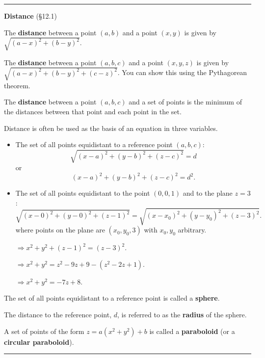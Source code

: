 \documentclass[12pt,letterpaper,noanswers]{exam}
\begin{document}
\vspace{0.2cm}
\hrule
\vspace{0.2cm}

\noindent\textbf{Distance} (\S12.1)
\begin{tcolorbox}
The \textbf{distance} between a point $(a,b)$ and a point $(x,y)$ is given by $\sqrt{(a-x)^2+(b-y)^2}$.

The \textbf{distance} between a point $(a,b,c)$ and a point $(x,y,z)$ is given by $\sqrt{(a-x)^2+(b-y)^2+(c-z)^2}$.  You can show this using the Pythagorean theorem.

The \textbf{distance} between a point $(a,b,c)$ and a set of points is the minimum of the distances between that point and each point in the set.
\end{tcolorbox}

Distance is often be used as the basis of an equation in three variables.

\begin{itemize}
    \item The set of all points equidistant to a reference point $(a,b,c)$: \[\sqrt{(x-a)^2+(y-b)^2 + (z-c)^2} = d\] or \[(x-a)^2 + (y-b)^2 + (z-c)^2 = d^2.\]
    \item The set of all points equidistant to the point $(0,0,1)$ and to the plane $z = 3$:
    \[\sqrt{(x-0)^2+(y-0)^2+(z-1)^2} = \sqrt{(x-x_0)^2 + (y-y_0)^2 + (z-3)^2}.\] where points on the plane are $(x_0,y_0,3)$ with $x_0,y_0$ arbitrary.
    
    $\Rightarrow x^2+y^2 + (z-1)^2 = (z-3)^2$. 
    
    $\Rightarrow x^2+y^2 = z^2-9z+9-(z^2-2z+1)$.
    
    
    $\Rightarrow x^2+y^2 = -7z+8$.
\end{itemize}

\begin{tcolorbox}
The set of all points equidistant to a reference point is called a \textbf{sphere}.

The distance to the reference point, $d$, is referred to as the \textbf{radius} of the sphere.

A set of points of the form $z = a(x^2+y^2)+b$ is called a \textbf{paraboloid} (or a \textbf{circular paraboloid}).
\end{tcolorbox}

\vspace{0.2cm}
\hrule
\vspace{0.2cm}
\end{document}
